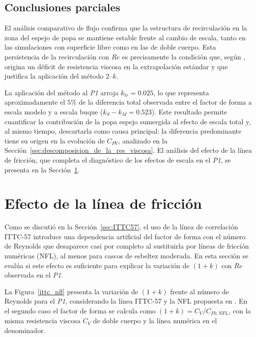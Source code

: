 \subsection{Conclusiones parciales}

El análisis comparativo de flujo confirma que la estructura de recirculación en la zona del espejo de popa se mantiene estable frente al cambio de escala, tanto en las simulaciones con superficie libre como en las de doble cuerpo. 
Esta persistencia de la recirculación con $Re$ es precisamente la condición que, según \citet{korkmaz_wetted_transom}, origina un déficit de resistencia viscosa en la extrapolación estándar y que justifica la aplicación del método 2--$k$.

La aplicación del método al \textit{P1} arroja $k_{tr} = 0{.}025$, lo que representa aproximadamente el $5\%$ de la diferencia total observada entre el factor de forma a escala modelo y a escala buque ($k_S - k_M = 0{.}523$). 
Este resultado permite cuantificar la contribución de la popa espejo sumergida al efecto de escala total y, al mismo tiempo, descartarla como causa principal: la diferencia predominante tiene su origen en la evolución de $C_{PV}$, analizado en la Sección~\ref{sec:descomposicion_de_la_res_viscosa}. 
El análisis del efecto de la línea de fricción, que completa el diagnóstico de los efectos de escala en el \textit{P1}, se presenta en la Sección~\ref{sec:linea_de_friccion}.

\section{Efecto de la línea de fricción}\label{sec:linea_de_friccion}

Como se discutió en la Sección~\ref{sec:ITTC57}, el uso de la línea de 
correlación ITTC-57 introduce una dependencia artificial del factor de forma 
con el número de Reynolds que desaparece casi por completo al sustituirla 
por líneas de fricción numéricas (NFL), al menos para cascos de esbeltez 
moderada. En esta sección se evalúa si este efecto es suficiente para 
explicar la variación de $(1+k)$ con $Re$ observada en el \textit{P1}.

La Figura~\ref{ittc_nfl} presenta la variación de $(1+k)$ frente al número 
de Reynolds para el \textit{P1}, considerando la línea ITTC-57 
\citep{ITTC_resistance} y la NFL propuesta en \citet{Korkmaz2019NumericalFL}.
En el segundo caso el factor de forma se calcula como
$(1+k) = C_V/C_{F0,\mathrm{NFL}}$, con la misma resistencia viscosa $C_V$ de doble
cuerpo y la línea numérica en el denominador.


